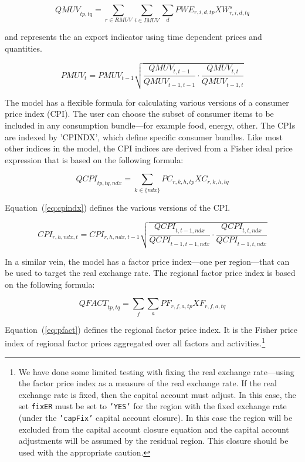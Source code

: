 \documentclass[11pt,letterpaper]{report}
\begin{document}
\[
\mathit{QMUV}_{\mathit{tp},\mathit{tq}} =
   \sum_{r \in {\mathit{RMUV}}} {\sum_{i \in {\mathit{IMUV}}} {\sum_d {
      \mathit{PWE}_{r,i,d,\mathit{tp}} \mathit{XW}^s_{r,i,d,\mathit{tq}}
   } } }
\]

\noindent and represents the an export indicator using time dependent prices and
quantities.

\begin{equation}
\label{eq:pmuv}
\mathit{PMUV}_t = \mathit{PMUV}_{t-1} \sqrt{
   \frac{\mathit{QMUV}_{\mathit{t},\mathit{t-1}}}
      {\mathit{QMUV}_{\mathit{t-1},\mathit{t-1}}} \cdot
   \frac{\mathit{QMUV}_{\mathit{t},\mathit{t}}}
      {\mathit{QMUV}_{\mathit{t-1},\mathit{t}}}
}
\end{equation}

The model has a flexible formula for calculating various versions of
a consumer price index (CPI). The user can choose the subset of
consumer items to be included in any consumption bundle---for
example food, energy, other. The CPIs are indexed by 'CPINDX', which
define specific consumer bundles. Like most other indices in the model,
the CPI indices are derived from a Fisher ideal price expression that
is based on the following formula:

\[
\mathit{QCPI}_{\mathit{tp},\mathit{tq}, \mathit{ndx}} =
   \sum_{k \in \{ndx\} } {
      \mathit{PC}_{r,k,h,\mathit{tp}} \mathit{XC}_{r,k,h,\mathit{tq}
   } }
\]

\noindent Equation~(\ref{eq:cpindx}) defines the various versions
of the CPI.

\begin{equation}
\label{eq:cpindx}
\mathit{CPI}_{r,h,\mathit{ndx},t} = \mathit{CPI}_{r,h,\mathit{ndx},t-1} \sqrt{
   \frac{\mathit{QCPI}_{\mathit{t},\mathit{t-1}, \mathit{ndx}}}
      {\mathit{QCPI}_{\mathit{t-1},\mathit{t-1}, \mathit{ndx}}} \cdot
   \frac{\mathit{QCPI}_{\mathit{t},\mathit{t}, \mathit{ndx}}}
      {\mathit{QCPI}_{\mathit{t-1},\mathit{t}, \mathit{ndx}}}
}
\end{equation}

In a similar vein, the model has a factor price index---one
per region---that can be used to target the real exchange rate.
The regional factor price index is based on the following
formula:

\[
\mathit{QFACT}_{\mathit{tp},\mathit{tq}} =
   \sum_{f } {\sum_a {
      \mathit{PF}_{r,f,a,\mathit{tp}} \mathit{XF}_{r,f,a,\mathit{tq}}
   } }
\]

Equation~(\ref{eq:pfact}) defines the regional factor price index.
It is the Fisher price index of regional factor prices aggregated over
all factors and activities.\footnote{We have done some limited testing
with fixing the real exchange rate---using the factor price index
as a measure of the real exchange rate. If the real exchange rate
is fixed, then the capital account must adjust. In this case,
the set \texttt{fixER} must be set to \texttt{'YES'} for the region
with the fixed exchange rate (under the \texttt{'capFix'} capital
account closure). In this case the region will be excluded from
the capital account closure equation and the capital account
adjustments will be assumed by the residual region. This closure
should be used with the appropriate caution.}
\end{document}

